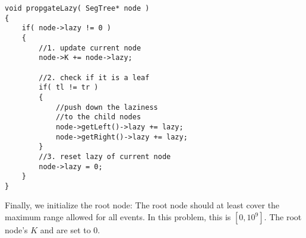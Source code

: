 \begin{lstlisting}[style=customc]
void propgateLazy( SegTree* node )
{
    if( node->lazy != 0 )
    {
        //1. update current node
        node->K += node->lazy;

        //2. check if it is a leaf
        if( tl != tr )
        {
            //push down the laziness
            //to the child nodes
            node->getLeft()->lazy += lazy;
            node->getRight()->lazy += lazy;
        }
        //3. reset lazy of current node
        node->lazy = 0;
    }
}
\end{lstlisting}

Finally, we initialize the root node: The root node should at least cover the maximum range allowed for all events. In this problem, this is $[0, 10^9]$. The root node's $K$ and  are set to 0.

